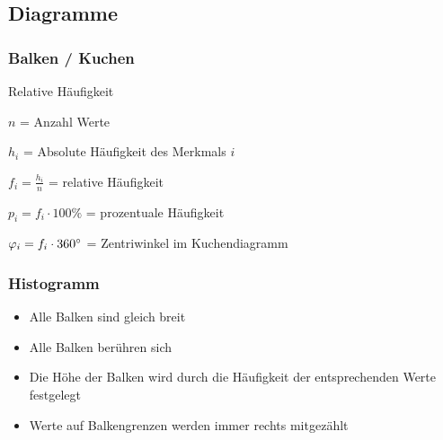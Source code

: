 \begin{multicols}{2}
\subsection*{Diagramme}
\subsubsection*{Balken / Kuchen}
\begin{definition*}{Relative Häufigkeit}{}

$n$ = Anzahl Werte

$h_i$ = Absolute Häufigkeit des Merkmals $i$

$f_i = \frac{h_i}n$ = relative Häufigkeit

$p_i = f_i\cdot{}100\%$ = prozentuale Häufigkeit

$\varphi_i = f_i\cdot{}360^\circ$ = Zentriwinkel im Kuchendiagramm
\end{definition*}



\subsubsection*{Histogramm}

\begin{itemize}
\item Alle Balken sind gleich breit
\item Alle Balken berühren sich
\item Die Höhe der Balken wird durch die Häufigkeit der entsprechenden
Werte festgelegt
\item Werte auf Balkengrenzen werden immer rechts mitgezählt
\end{itemize}



\end{multicols}

